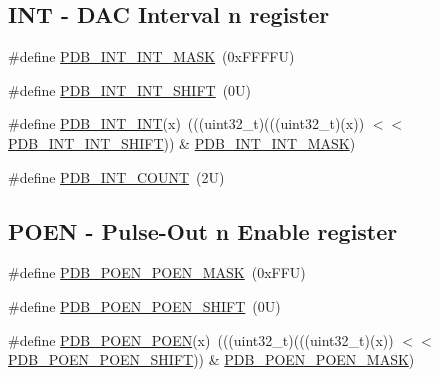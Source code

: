 \subsection*{I\+NT -\/ D\+AC Interval n register}
\begin{DoxyCompactItemize}
\item 
\#define \mbox{\hyperlink{group___p_d_b___register___masks_ga04262fdbd8c3565c23a025cb119f1549}{P\+D\+B\+\_\+\+I\+N\+T\+\_\+\+I\+N\+T\+\_\+\+M\+A\+SK}}~(0x\+F\+F\+F\+F\+U)
\item 
\#define \mbox{\hyperlink{group___p_d_b___register___masks_ga5b99cf0c9ae2fa2cf6e4200a7e3bf13b}{P\+D\+B\+\_\+\+I\+N\+T\+\_\+\+I\+N\+T\+\_\+\+S\+H\+I\+FT}}~(0\+U)
\item 
\#define \mbox{\hyperlink{group___p_d_b___register___masks_ga8b612d1c7684422f1c6b14cd069814ab}{P\+D\+B\+\_\+\+I\+N\+T\+\_\+\+I\+NT}}(x)~(((uint32\+\_\+t)(((uint32\+\_\+t)(x)) $<$$<$ \mbox{\hyperlink{group___p_d_b___register___masks_ga5b99cf0c9ae2fa2cf6e4200a7e3bf13b}{P\+D\+B\+\_\+\+I\+N\+T\+\_\+\+I\+N\+T\+\_\+\+S\+H\+I\+FT}})) \& \mbox{\hyperlink{group___p_d_b___register___masks_ga04262fdbd8c3565c23a025cb119f1549}{P\+D\+B\+\_\+\+I\+N\+T\+\_\+\+I\+N\+T\+\_\+\+M\+A\+SK}})
\item 
\#define \mbox{\hyperlink{group___p_d_b___register___masks_ga399d94cea38666c872ded3e7f714509c}{P\+D\+B\+\_\+\+I\+N\+T\+\_\+\+C\+O\+U\+NT}}~(2\+U)
\end{DoxyCompactItemize}
\subsection*{P\+O\+EN -\/ Pulse-\/\+Out n Enable register}
\begin{DoxyCompactItemize}
\item 
\#define \mbox{\hyperlink{group___p_d_b___register___masks_gadff2842454cba42f94cc2568cd20df3d}{P\+D\+B\+\_\+\+P\+O\+E\+N\+\_\+\+P\+O\+E\+N\+\_\+\+M\+A\+SK}}~(0x\+F\+F\+U)
\item 
\#define \mbox{\hyperlink{group___p_d_b___register___masks_ga00643f248ccf8b14021f9983f0e32ac8}{P\+D\+B\+\_\+\+P\+O\+E\+N\+\_\+\+P\+O\+E\+N\+\_\+\+S\+H\+I\+FT}}~(0\+U)
\item 
\#define \mbox{\hyperlink{group___p_d_b___register___masks_gaf0b83a8c4124b3bdf53e5173d121db0f}{P\+D\+B\+\_\+\+P\+O\+E\+N\+\_\+\+P\+O\+EN}}(x)~(((uint32\+\_\+t)(((uint32\+\_\+t)(x)) $<$$<$ \mbox{\hyperlink{group___p_d_b___register___masks_ga00643f248ccf8b14021f9983f0e32ac8}{P\+D\+B\+\_\+\+P\+O\+E\+N\+\_\+\+P\+O\+E\+N\+\_\+\+S\+H\+I\+FT}})) \& \mbox{\hyperlink{group___p_d_b___register___masks_gadff2842454cba42f94cc2568cd20df3d}{P\+D\+B\+\_\+\+P\+O\+E\+N\+\_\+\+P\+O\+E\+N\+\_\+\+M\+A\+SK}})
\end{DoxyCompactItemize}
